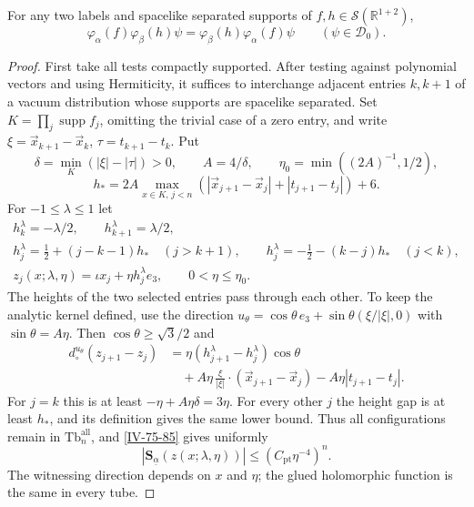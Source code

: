\documentclass[11pt,letterpaper,reqno]{amsart}
\makeatletter
\theoremstyle{definition}
\newcommand{\ms@minorstart}{%
  \pushQED{\qed}\renewcommand{\qedsymbol}{$\blacksquare$}}
\newenvironment{proposition}[1][]{\ms@minorstart\ms@proposition[#1]}
  {\popQED\endms@proposition}
\theoremstyle{remark}
\makeatother
\begin{document}
\begin{proposition}[Locality]\label{IV-76-52}
For any two labels and spacelike separated supports of
$f,h\in\mathcal S(\mathbb R^{1+2})$,
\begin{equation}\label{IV-76-53}
 \varphi_\alpha(f)\varphi_\beta(h)\psi
       =\varphi_\beta(h)\varphi_\alpha(f)\psi
                         \qquad(\psi\in\mathcal D_0).
\end{equation}
\end{proposition}
\begin{proof}
First take all tests compactly supported. After testing
against polynomial vectors and using Hermiticity, it
suffices to interchange adjacent entries $k,k+1$ of a
vacuum distribution whose supports are spacelike separated.
Set $K=\prod_j\operatorname{supp}f_j$, omitting the trivial
case of a zero entry, and write
$\xi=\vec x_{k+1}-\vec x_k$, $\tau=t_{k+1}-t_k$.
Put
\[
 \delta=\min_K(|\xi|-|\tau|)>0,\qquad A=4/\delta,
 \qquad\eta_0=\min((2A)^{-1},1/2),
\]
\[
 h_*=2A\max_{x\in K,\,j<n}
          (|\vec x_{j+1}-\vec x_j|+|t_{j+1}-t_j|)+6.
\]
For $-1\le\lambda\le1$ let
\begin{equation}\label{IV-76-54}
 \begin{gathered}
 h_k^\lambda=-\lambda/2,\qquad h_{k+1}^\lambda=\lambda/2,\\
 h_j^\lambda=\tfrac12+(j-k-1)h_*\quad(j>k+1),\qquad
 h_j^\lambda=-\tfrac12-(k-j)h_*\quad(j<k),\\
 z_j(x;\lambda,\eta)=\iota x_j+\eta h_j^\lambda e_3,
                         \qquad0<\eta\le\eta_0.
 \end{gathered}
\end{equation}
The heights of the two selected entries pass through each
other. To keep the analytic kernel defined, use the direction
$u_\theta=\cos\theta\,e_3+\sin\theta(\xi/|\xi|,0)$ with
$\sin\theta=A\eta$. Then $\cos\theta\ge\sqrt3/2$ and
\begin{equation}\label{IV-76-55}
 \begin{split}
 d_\circ^{u_\theta}(z_{j+1}-z_j)
 &=\eta(h_{j+1}^\lambda-h_j^\lambda)\cos\theta\\
 &\quad+A\eta\,\frac{\xi}{|\xi|}\cdot
                 (\vec x_{j+1}-\vec x_j)
                          -A\eta|t_{j+1}-t_j|.
 \end{split}
\end{equation}
For $j=k$ this is at least $-\eta+A\eta\delta=3\eta$.
For every other $j$ the height gap is at least $h_*$,
and its definition gives the same lower bound. Thus all
configurations remain in $\mathrm{Tb}^{\mathrm{all}}_n$,
and \eqref{IV-75-85} gives uniformly
\begin{equation}\label{IV-76-56}
 |\mathbf S_{\underline\alpha}(z(x;\lambda,\eta))|
                           \le(C_{\mathrm{pt}}\eta^{-4})^n.
\end{equation}
The witnessing direction depends on $x$ and $\eta$;
the glued holomorphic function is the same in every tube.


\end{proof}
\end{document}

